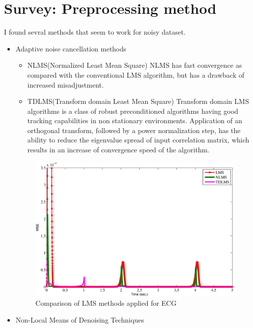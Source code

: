 \documentclass[dvipdfmx]{article}
\begin{document}
\section{Survey: Preprocessing method}
I found sevral methods that seem to work for noisy dataset.
\begin{itemize}
    \item Adaptive noise cancellation methods
    \begin{itemize}
        \item NLMS(Normalized Least Mean Square)
        NLMS has fast convergence as compared with the conventional LMS algorithm, but has a drawback of increased misadjustment.
        \item TDLMS(Transform domain Least Mean Square)
        Transform domain LMS algorithms is a class of robust preconditioned algorithms having good tracking capabilities in non stationary environments. Application of an orthogonal transform, followed by a power normalization step, has the ability to reduce the eigenvalue spread of input correlation matrix, which results in an increase of convergence speed of the algorithm.
    \end{itemize}
    
    \begin{figure}[H]
    \begin{center}
    \includegraphics[width=\linewidth]{"./img/LMS_comp.png"}
    \end{center}
    \caption{Comparison of LMS methods applied for ECG}
    \end{figure}

    \item Non-Local Means of Denoising Techniques


\end{itemize}
\end{document}
